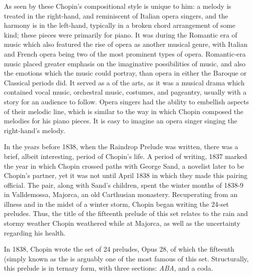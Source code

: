 As seen by these  Chopin's compositional style is unique to him: a melody is treated in the right-hand, and reminiscent of Italian opera singers, and the harmony is in the left-hand, typically in a broken chord arrangement of some kind; these pieces were primarily for piano. It was during the Romantic era of music which also featured the rise of opera as another musical genre, with Italian and French opera being two of the most prominent types of opera\autocite{Burkholder_Grout_Palisca_2014}. Romantic-era music placed greater emphasis on the imaginative possibilities of music, and also the emotions which the music could portray, than opera in either the Baroque or Classical periods did. It served as a  of the arts, as it was a musical drama which contained vocal music, orchestral music, costumes, and pageantry, usually with a story for an audience to follow. Opera singers had the ability to embellish aspects of their melodic line, which is similar to the way in which Chopin composed the melodies for his piano pieces. It is easy to imagine an opera singer singing the right-hand's melody.

In the years before 1838, when the Raindrop Prelude was written, there was a brief, albeit interesting, period of Chopin's life. A period of writing, 1837 marked the year in which Chopin crossed paths with George Sand, a novelist later to be Chopin's partner, yet it was not until April 1838 in which they made this pairing official. The pair, along with Sand's children, spent the winter months of 1838-9 in Valldemossa, Majorca, an old Carthusian monastery. Recuperating from an illness and in the midst of a winter storm, Chopin began writing the 24-set preludes\autocite{Samson_2001}. Thus, the title of the fifteenth prelude of this set relates to the rain and stormy weather Chopin weathered while at Majorca, as well as the uncertainty regarding his health.

In 1838, Chopin wrote the set of 24 preludes, Opus 28, of which the fifteenth (simply known as the  is arguably one of the most famous of this set. Structurally, this prelude is in ternary form, with three sections: \textit{ABA}, and a coda. 

